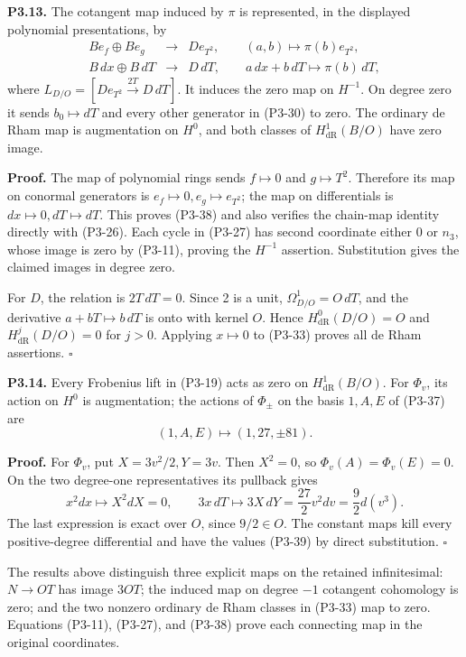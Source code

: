 \documentclass[
]{article}
\begin{document}
\textbf{P3.13.} The cotangent map induced by \(\pi\) is represented, in
the displayed polynomial presentations, by \[
\begin{array}{rcl}
B e_f\oplus B e_g&\longrightarrow&D e_{T^2},
\qquad(a,b)\longmapsto\pi(b)e_{T^2},\\
B\,dx\oplus B\,dT&\longrightarrow&D\,dT,
\qquad a\,dx+b\,dT\longmapsto\pi(b)\,dT,
\end{array}
\tag{P3-38}
\] where \(L_{D/O}=[D e_{T^2}\xrightarrow{2T}D\,dT]\). It induces the
zero map on \(H^{-1}\). On degree zero it sends \(b_0\mapsto dT\) and
every other generator in (P3-30) to zero. The ordinary de Rham map is
augmentation on \(H^0\), and both classes of \(H^1_{\mathrm{dR}}(B/O)\)
have zero image.

\textbf{Proof.} The map of polynomial rings sends \(f\mapsto0\) and
\(g\mapsto T^2\). Therefore its map on conormal generators is
\(e_f\mapsto0,e_g\mapsto e_{T^2}\); the map on differentials is
\(dx\mapsto0,dT\mapsto dT\). This proves (P3-38) and also verifies the
chain-map identity directly with (P3-26). Each cycle in (P3-27) has
second coordinate either 0 or \(n_3\), whose image is zero by (P3-11),
proving the \(H^{-1}\) assertion. Substitution gives the claimed images
in degree zero.

For \(D\), the relation is \(2T\,dT=0\). Since 2 is a unit,
\(\Omega^1_{D/O}=O\,dT\), and the derivative \(a+bT\mapsto b\,dT\) is
onto with kernel \(O\). Hence \(H^0_{\mathrm{dR}}(D/O)=O\) and
\(H^j_{\mathrm{dR}}(D/O)=0\) for \(j>0\). Applying \(x\mapsto0\) to
(P3-33) proves all de Rham assertions. \(\square\)

\textbf{P3.14.} Every Frobenius lift in (P3-19) acts as zero on
\(H^1_{\mathrm{dR}}(B/O)\). For \(\Phi_v\), its action on \(H^0\) is
augmentation; the actions of \(\Phi_\pm\) on the basis \(1,A,E\) of
(P3-37) are \[
(1,A,E)\longmapsto(1,27,\pm81).
\tag{P3-39}
\]

\textbf{Proof.} For \(\Phi_v\), put \(X=3v^2/2,Y=3v\). Then \(X^2=0\),
so \(\Phi_v(A)=\Phi_v(E)=0\). On the two degree-one representatives its
pullback gives \[
x^2dx\longmapsto X^2dX=0,\qquad
3x\,dT\longmapsto3X\,dY
=\frac{27}{2}v^2dv=\frac92d(v^3).
\] The last expression is exact over \(O\), since \(9/2\in O\). The
constant maps kill every positive-degree differential and have the
values (P3-39) by direct substitution. \(\square\)

The results above distinguish three explicit maps on the retained
infinitesimal: \(N\to OT\) has image \(3OT\); the induced map on degree
\(-1\) cotangent cohomology is zero; and the two nonzero ordinary de
Rham classes in (P3-33) map to zero. Equations (P3-11), (P3-27), and
(P3-38) prove each connecting map in the original coordinates.
\end{document}
